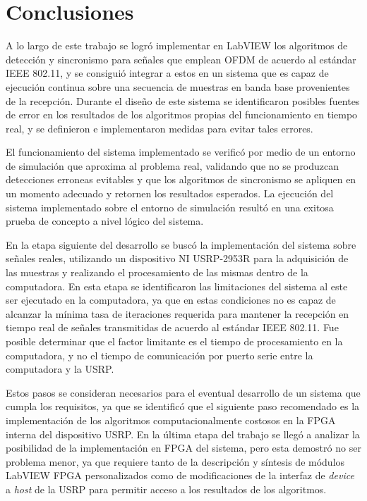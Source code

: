 \chapter{Conclusiones}
\label{Ch:6}
\graphicspath{{figs/}}

A lo largo de este trabajo se logró implementar en LabVIEW los algoritmos de detección y sincronismo para señales que emplean OFDM de acuerdo al estándar IEEE 802.11, y se consiguió integrar a estos en un sistema que es capaz de ejecución continua sobre una secuencia de muestras en banda base provenientes de la recepción. Durante el diseño de este sistema se identificaron posibles fuentes de error en los resultados de los algoritmos propias del funcionamiento en tiempo real, y se definieron e implementaron medidas para evitar tales errores. 

El funcionamiento del sistema implementado se verificó por medio de un entorno de simulación que aproxima al problema real, validando que no se produzcan detecciones erroneas evitables y que los algoritmos de sincronismo se apliquen en un momento adecuado y retornen los resultados esperados. La ejecución del sistema implementado sobre el entorno de simulación resultó en una exitosa prueba de concepto a nivel lógico del sistema.

En la etapa siguiente del desarrollo se buscó la implementación del sistema sobre señales reales, utilizando un dispositivo NI USRP-2953R para la adquisición de las muestras y realizando el procesamiento de las mismas dentro de la computadora. En esta etapa se identificaron las limitaciones del sistema al este ser ejecutado en la computadora, ya que en estas condiciones no es capaz de alcanzar la mínima tasa de iteraciones requerida para mantener la recepción en tiempo real de señales transmitidas de acuerdo al estándar IEEE 802.11. Fue posible determinar que el factor limitante es el tiempo de procesamiento en la computadora, y no el tiempo de comunicación por puerto serie entre la computadora y la USRP.

Estos pasos se consideran necesarios para el eventual desarrollo de un sistema que cumpla los requisitos, ya que se identificó que el siguiente paso recomendado es la implementación de los algoritmos computacionalmente costosos en la FPGA interna del dispositivo USRP. En la última etapa del trabajo se llegó a analizar la posibilidad de la implementación en FPGA del sistema, pero esta demostró no ser problema menor, ya que requiere tanto de la descripción y síntesis de módulos LabVIEW FPGA personalizados como de modificaciones de la interfaz de \textit{device} a \textit{host} de la USRP para permitir acceso a los resultados de los algoritmos.

